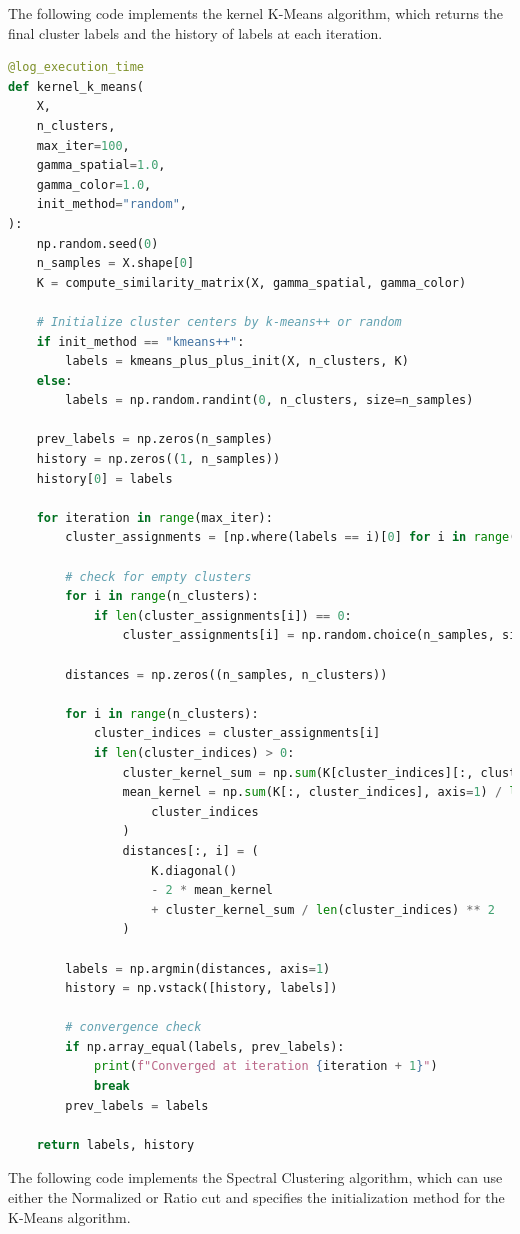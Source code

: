 \documentclass{homework}
\begin{document}
The following code implements the kernel K-Means algorithm, which returns the final cluster labels and the history of labels at each iteration.

\begin{lstlisting}[language=Python]
@log_execution_time
def kernel_k_means(
    X,
    n_clusters,
    max_iter=100,
    gamma_spatial=1.0,
    gamma_color=1.0,
    init_method="random",
):
    np.random.seed(0)
    n_samples = X.shape[0]
    K = compute_similarity_matrix(X, gamma_spatial, gamma_color)

    # Initialize cluster centers by k-means++ or random
    if init_method == "kmeans++":
        labels = kmeans_plus_plus_init(X, n_clusters, K)
    else:
        labels = np.random.randint(0, n_clusters, size=n_samples)

    prev_labels = np.zeros(n_samples)
    history = np.zeros((1, n_samples))
    history[0] = labels

    for iteration in range(max_iter):
        cluster_assignments = [np.where(labels == i)[0] for i in range(n_clusters)]

        # check for empty clusters
        for i in range(n_clusters):
            if len(cluster_assignments[i]) == 0:
                cluster_assignments[i] = np.random.choice(n_samples, size=1)

        distances = np.zeros((n_samples, n_clusters))

        for i in range(n_clusters):
            cluster_indices = cluster_assignments[i]
            if len(cluster_indices) > 0:
                cluster_kernel_sum = np.sum(K[cluster_indices][:, cluster_indices])
                mean_kernel = np.sum(K[:, cluster_indices], axis=1) / len(
                    cluster_indices
                )
                distances[:, i] = (
                    K.diagonal()
                    - 2 * mean_kernel
                    + cluster_kernel_sum / len(cluster_indices) ** 2
                )

        labels = np.argmin(distances, axis=1)
        history = np.vstack([history, labels])

        # convergence check
        if np.array_equal(labels, prev_labels):
            print(f"Converged at iteration {iteration + 1}")
            break
        prev_labels = labels

    return labels, history
\end{lstlisting}

The following code implements the Spectral Clustering algorithm, which can use either the Normalized or Ratio cut and specifies the initialization method for the K-Means algorithm.
\end{document}
